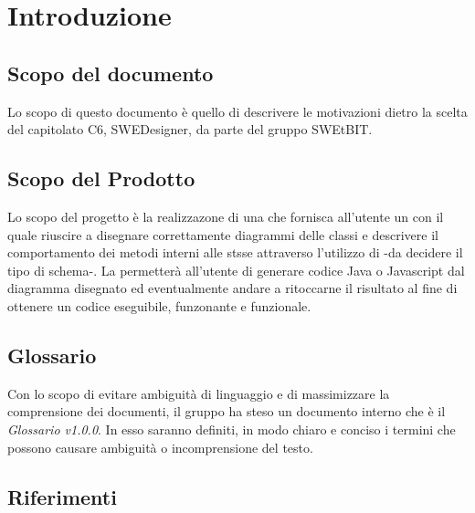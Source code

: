 \section{Introduzione}
  \subsection{Scopo del documento}
          Lo scopo di questo documento è quello di descrivere le motivazioni dietro la scelta del capitolato C6, SWEDesigner, da parte del gruppo SWEtBIT.
  \subsection{Scopo del Prodotto}
          Lo scopo del progetto è la realizzazone di una  che fornisca all'utente un   con il quale riuscire a disegnare correttamente diagrammi delle classi
          e descrivere il comportamento dei metodi interni alle stsse attraverso l'utilizzo di -da decidere il tipo di schema-.
          La  permetterà all'utente di generare codice Java o Javascript dal diagramma disegnato ed eventualmente andare a ritoccarne il risultato al fine di ottenere un codice
          eseguibile, funzonante e funzionale.
  \subsection{Glossario}
          Con lo scopo di evitare ambiguità di linguaggio e di massimizzare la comprensione dei documenti, il
          gruppo ha steso un documento interno che è il \emph{Glossario v1.0.0}. In esso saranno definiti, in modo
          chiaro e conciso i termini che possono causare ambiguità o incomprensione del testo.
  \subsection{Riferimenti}
